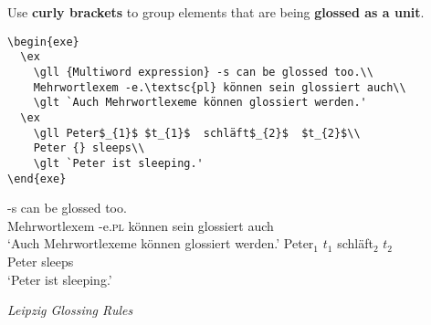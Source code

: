 \begin{frame}[fragile]


Use \textbf{curly brackets} to group elements that are being \textbf{glossed as a unit}.

\begin{lstlisting}
\begin{exe}
  \ex
    \gll {Multiword expression} -s can be glossed too.\\
    Mehrwortlexem -e.\textsc{pl} können sein glossiert auch\\
    \glt `Auch Mehrwortlexeme können glossiert werden.'
  \ex 
    \gll Peter$_{1}$ $t_{1}$  schläft$_{2}$  $t_{2}$\\
    Peter {} sleeps\\
    \glt `Peter ist sleeping.'
\end{exe}
\end{lstlisting}


\begin{exe}
\ex
   -s can be glossed too.\\
Mehrwortlexem -e.\textsc{pl} können sein glossiert auch\\
\glt `Auch Mehrwortlexeme können glossiert werden.'
\ex 
\gll Peter$_{1}$ $t_{1}$  schläft$_{2}$  $t_{2}$\\
Peter {} sleeps\\
\glt `Peter ist sleeping.'
\end{exe}

\hfill \emph{Leipzig Glossing Rules} \citep[cf.][]{LeipzigGloss15a}

\end{frame}


